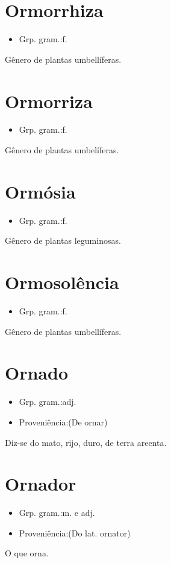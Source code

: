 \section{Ormorrhiza}
\begin{itemize}
\item {Grp. gram.:f.}
\end{itemize}
Gênero de plantas umbellíferas.
\section{Ormorriza}
\begin{itemize}
\item {Grp. gram.:f.}
\end{itemize}
Gênero de plantas umbelíferas.
\section{Ormósia}
\begin{itemize}
\item {Grp. gram.:f.}
\end{itemize}
Gênero de plantas leguminosas.
\section{Ormosolência}
\begin{itemize}
\item {Grp. gram.:f.}
\end{itemize}
Gênero de plantas umbellíferas.
\section{Ornado}
\begin{itemize}
\item {Grp. gram.:adj.}
\end{itemize}
\begin{itemize}
\item {Proveniência:(De \textunderscore ornar\textunderscore )}
\end{itemize}
Diz-se do mato, rijo, duro, de terra areenta.
\section{Ornador}
\begin{itemize}
\item {Grp. gram.:m.  e  adj.}
\end{itemize}
\begin{itemize}
\item {Proveniência:(Do lat. \textunderscore ornator\textunderscore )}
\end{itemize}
O que orna.
